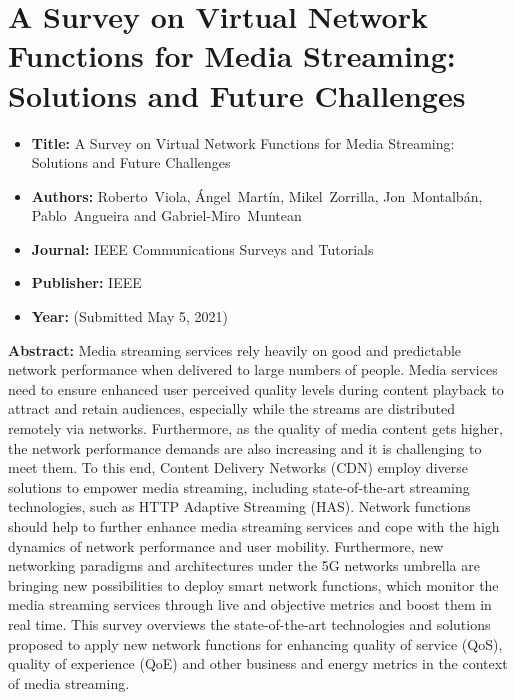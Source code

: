 

\section[A Survey on Virtual Network Functions for Media Streaming: Solutions and Future Challenges]{A Survey on Virtual Network Functions for Media Streaming: Solutions and Future Challenges}
\label{chap:IEEECOMST2021}
\begin{itemize} \itemsep1pt\parskip0pt
	\item \textbf{Title:} A Survey on Virtual Network Functions for Media Streaming: Solutions and Future Challenges
	\item \textbf{Authors:} Roberto~Viola, \'Angel~Mart\'in, Mikel~Zorrilla, Jon~Montalb\'an, Pablo~Angueira and Gabriel-Miro~Muntean
	\item \textbf{Journal:} IEEE Communications Surveys and Tutorials
	\item \textbf{Publisher:} IEEE
	\item \textbf{Year:} (Submitted May 5, 2021)
\end{itemize}	
	
\textbf{Abstract:} Media streaming services rely heavily on good and predictable network performance when delivered to large numbers of people. Media services need to ensure enhanced user perceived quality levels during content playback to attract and retain audiences, especially while the streams are distributed remotely via networks. Furthermore, as the quality of media content gets higher, the network performance demands are also increasing and it is challenging to meet them. To this end, Content Delivery Networks (CDN) employ diverse solutions to empower media streaming, including \hbox{state-of-the-art} streaming technologies, such as HTTP Adaptive Streaming (HAS). Network functions should help to further enhance media streaming services and cope with the high dynamics of network performance and user mobility. Furthermore, new networking paradigms and architectures under the 5G networks umbrella are bringing new possibilities to deploy smart network functions, which monitor the media streaming services through live and objective metrics and boost them in real time. This survey overviews the state-of-the-art technologies and solutions proposed to apply new network functions for enhancing quality of service (QoS), quality of experience (QoE) and other business and energy metrics in the context of media streaming.
	
